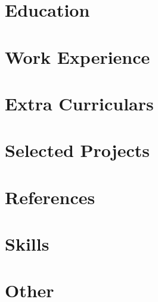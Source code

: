 \documentclass[a4paper,11pt]{article}
\begin{document}
\pagestyle{empty}



\section{Education}


\section{Work Experience}




% 

\section{Extra Curriculars}



\section{Selected Projects}



\newpage




% 
% 
% 
% 
% 

\section{References}


\section{Skills}


\section{Other}

\end{document}
